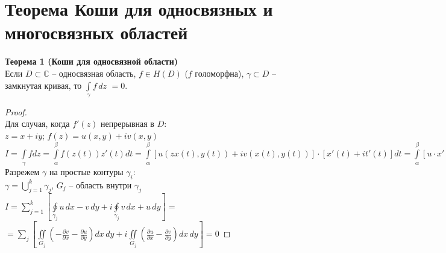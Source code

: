\newpage
\section{Теорема Коши для односвязных и многосвязных областей}
\textbf{Теорема 1 (Коши для односвязной области)}\\
Если $D \subset \mathbb{C}$ -- односвязная область, $f \in H(D)$ ($f$ голоморфна), $\gamma \subset D$ -- замкнутая кривая, то \(\int \limits_{\gamma} f\, dz\) $= 0$.


\begin{proof}
    \ \\
    Для случая, когда $f'(z)$ непрерывная в $D$:\\
    $z=x+iy$; $f(z)=u(x,y)+iv(x,y)$\\
    $I = \int\limits_{\gamma}fdz = \int\limits_{\alpha}^{\beta}f(z(t))z'(t)dt = \int \limits_{\alpha}^{\beta}[u(zx(t),y(t))+iv(x(t), y(t))]\cdot [x'(t)+it'(t)]dt = \int\limits_{\alpha}^{\beta}[u\cdot x'-v\cdot y')+i(uy'+vx')]dt=\int\limits_{\alpha}^{\beta}(ux'-vy')dt+i\int\limits_{\alpha}^{\beta}(uy'+vx')dt = \int\limits_{\gamma}udx-vdy +i\int\limits_{\gamma}udy+vdx=$
    Разрежем $\gamma$ на простые контуры $\gamma_i$:\\
    $\gamma=\bigcup\limits_{j=1}^{k}\gamma_j$, $G_j$ -- область внутри $\gamma_j$\\
    $I = \sum_{j=1}^k \left[ \oint\limits_{\gamma_j}u\,dx-v\,dy+i\oint\limits_{\gamma_j}v\,dx+u\,dy \right] =$\\
    $= \sum_j \left[ \iint\limits_{G_j}\left(-\frac{\partial v}{\partial x}-\frac{\partial u}{\partial y} \right)dx\,dy + i\iint\limits_{G_j}\left(\frac{\partial u}{\partial x}-\frac{\partial v}{\partial y} \right)dx\,dy \right] = 0$
\end{proof}


